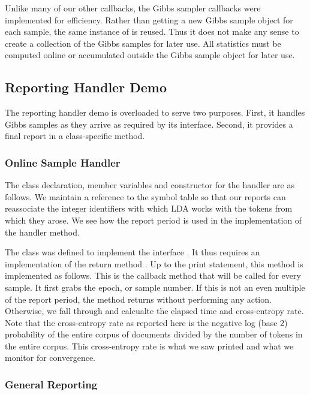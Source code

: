 Unlike many of our other callbacks, the Gibbs sampler callbacks
were implemented for efficiency.  Rather than getting a new
Gibbs sample object for each sample, the same instance of
 is reused.  Thus it does not make any sense
to create a collection of the Gibbs samples for later use.  
All statistics must be computed online or accumulated outside
the Gibbs sample object for later use.

\subsection{Reporting Handler Demo}

The reporting handler demo is overloaded to serve two purposes.
First, it handles Gibbs samples as they arrive as required by
its interface.  Second, it provides a final report in a
class-specific method.

\subsubsection{Online Sample Handler}

The class declaration, member variables and constructor for the
handler are as follows.
%
%
We maintain a reference to the symbol table so that our reports can
reassociate the integer identifiers with which LDA works with the
tokens from which they arose.  We see how the report period is used in
the implementation of the handler method.

The class was defined to implement the interface
.  It thus requires an implementation
of the  return method .  Up to
the print statement, this method is implemented as follows.
%
%
This is the callback method that will be called for every sample.  It
first grabs the epoch, or sample number.  If this is not an even
multiple of the report period, the method returns without performing
any action.  Otherwise, we fall through and calcualte the elapsed time
and cross-entropy rate.  Note that the cross-entropy rate as reported
here is the negative log (base 2) probability of the entire corpus of
documents divided by the number of tokens in the entire corpus.  
This cross-entropy rate is what we saw printed and what we monitor for
convergence.

\subsubsection{General Reporting}

